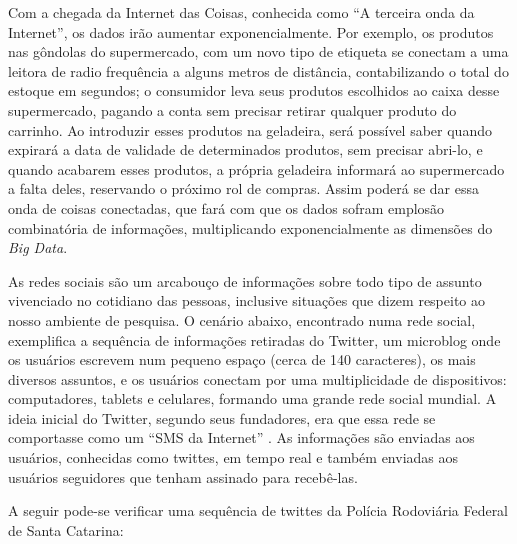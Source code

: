 Com a chegada da Internet das Coisas, conhecida como ``A terceira onda da Internet'', os dados irão aumentar exponencialmente. Por exemplo, 
os produtos nas gôndolas do supermercado, com um novo tipo de etiqueta se conectam a uma leitora de radio frequência a alguns metros de distância, 
contabilizando o total do estoque em segundos; o consumidor leva seus produtos escolhidos ao caixa desse supermercado, pagando a conta sem precisar retirar qualquer 
produto do carrinho. Ao introduzir esses produtos na geladeira, será possível saber quando expirará a data de validade de determinados produtos, sem 
precisar abri-lo, e quando acabarem esses produtos, a própria geladeira informará ao supermercado a falta deles, reservando o próximo rol de compras. 
Assim poderá se dar essa onda de coisas conectadas, que fará com que os dados sofram emplosão combinatória de informações, multiplicando exponencialmente as dimensões do 
\textit{Big Data}.

As redes sociais são um arcabouço de informações sobre todo tipo de assunto vivenciado no cotidiano das pessoas, inclusive situações que dizem respeito ao nosso ambiente de pesquisa.
O cenário abaixo, encontrado numa rede social, exemplifica a sequência de informações retiradas do Twitter, um microblog onde os usuários escrevem num pequeno espaço (cerca de 140 caracteres), 
os mais diversos assuntos, e os usuários conectam por uma multiplicidade de dispositivos: computadores, tablets e celulares, formando uma grande rede social mundial. 
A ideia inicial do Twitter, segundo seus fundadores, era que essa rede se comportasse como um ``SMS da Internet'' \cite{Twitter2015}. 
As informações são enviadas aos usuários, conhecidas como twittes, em tempo real e também enviadas aos usuários seguidores que tenham assinado para recebê-las.


A seguir pode-se verificar uma sequência de twittes da Polícia Rodoviária Federal de Santa Catarina:

\begin{figure}[ht]
\quad \quad \quad \quad
{}
\end{figure}

